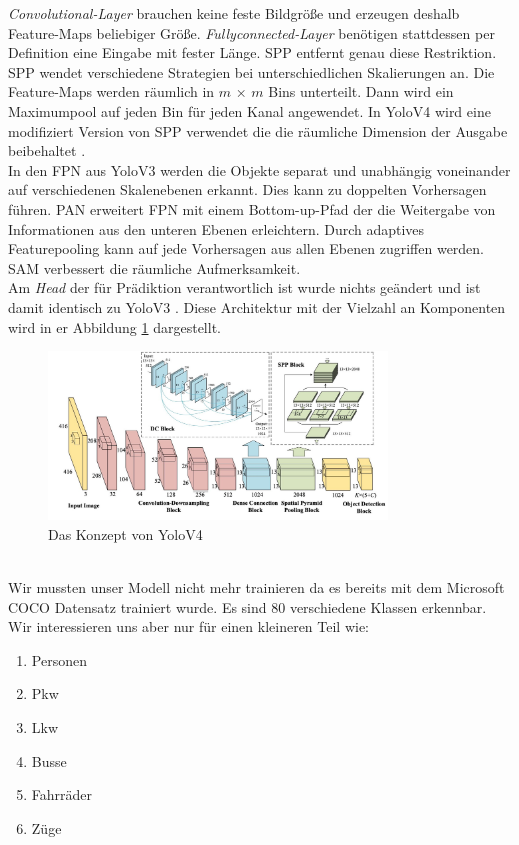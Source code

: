 \documentclass[conference]{IEEEtran}
\begin{document}
	\textit{Convolutional-Layer} brauchen keine feste Bildgröße und erzeugen deshalb  Feature-Maps beliebiger Größe. \textit{Fullyconnected-Layer} benötigen stattdessen per Definition eine Eingabe mit fester Länge. SPP entfernt genau diese Restriktion. SPP wendet verschiedene Strategien bei unterschiedlichen Skalierungen an. Die Feature-Maps werden räumlich in $m$ × $m$ Bins unterteilt. Dann wird ein Maximumpool auf jeden Bin für jeden Kanal angewendet. In YoloV4 wird eine modifiziert Version von SPP verwendet die die räumliche Dimension der Ausgabe beibehaltet \cite{b9}.\\
	In den FPN aus YoloV3 werden die Objekte separat und unabhängig voneinander auf verschiedenen Skalenebenen erkannt. Dies kann zu doppelten Vorhersagen führen. PAN erweitert FPN mit einem Bottom-up-Pfad der die Weitergabe von Informationen aus den unteren Ebenen erleichtern. Durch adaptives Featurepooling kann auf jede Vorhersagen aus allen Ebenen zugriffen werden.\cite{b10}\\
	SAM verbessert die räumliche Aufmerksamkeit.\\
	Am \textit{Head} der für Prädiktion verantwortlich ist wurde nichts geändert und  ist damit identisch zu YoloV3 \cite{b2}\cite{b8}. Diese Architektur mit der Vielzahl an Komponenten wird in er Abbildung \ref{V4Arch} dargestellt.
	\begin{figure}[!h]
		\begin{center}
			\includegraphics[width=9cm]{Media/YoloV4Arch.jpeg}
			\caption{Das Konzept von YoloV4 \cite{b8}}
			\label{V4Arch}
		\end{center}
	\end{figure}\\
	Wir mussten unser Modell nicht mehr trainieren da es bereits mit dem Microsoft COCO Datensatz trainiert wurde. Es sind 80 verschiedene Klassen erkennbar. Wir interessieren uns aber nur für einen kleineren Teil wie:
	\begin{enumerate}
		\item Personen
		\item Pkw
		\item Lkw
		\item Busse
		\item Fahrräder
		\item Züge
	\end{enumerate}
\end{document}
